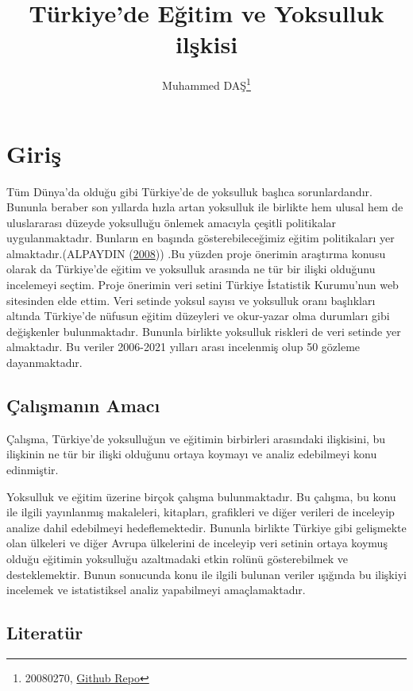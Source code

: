 \documentclass[
  12pt,
]{article}
\title{Türkiye'de Eğitim ve Yoksulluk ilşkisi}
\author{Muhammed DAŞ\footnote{20080270, \href{https://github.com/muhammedddas/aynen}{Github Repo}}}
\date{}
\begin{document}
\maketitle

\hypertarget{giriux15f}{%
\section{Giriş}\label{giriux15f}}

Tüm Dünya'da olduğu gibi Türkiye'de de yoksulluk başlıca sorunlardandır. Bununla beraber son yıllarda hızla artan yoksulluk ile birlikte hem ulusal hem de uluslararası düzeyde yoksulluğu önlemek amacıyla çeşitli politikalar uygulanmaktadır. Bunların en başında gösterebileceğimiz eğitim politikaları yer almaktadır.(ALPAYDIN (\protect\hyperlink{ref-alpaydin2008turkiye}{2008})) .Bu yüzden proje önerimin araştırma konusu olarak da Türkiye'de eğitim ve yoksulluk arasında ne tür bir ilişki olduğunu incelemeyi seçtim. Proje önerimin veri setini Türkiye İstatistik Kurumu'nun web sitesinden elde ettim. Veri setinde yoksul sayısı ve yoksulluk oranı başlıkları altında Türkiye'de nüfusun eğitim düzeyleri ve okur-yazar olma durumları gibi değişkenler bulunmaktadır. Bununla birlikte yoksulluk riskleri de veri setinde yer almaktadır. Bu veriler 2006-2021 yılları arası incelenmiş olup 50 gözleme dayanmaktadır.

\hypertarget{uxe7alux131ux15fmanux131n-amacux131}{%
\subsection{Çalışmanın Amacı}\label{uxe7alux131ux15fmanux131n-amacux131}}

Çalışma, Türkiye'de yoksulluğun ve eğitimin birbirleri arasındaki ilişkisini, bu ilişkinin ne tür bir ilişki olduğunu ortaya koymayı ve analiz edebilmeyi konu edinmiştir.

Yoksulluk ve eğitim üzerine birçok çalışma bulunmaktadır. Bu çalışma, bu konu ile ilgili yayınlanmış makaleleri, kitapları, grafikleri ve diğer verileri de inceleyip analize dahil edebilmeyi hedeflemektedir. Bununla birlikte Türkiye gibi gelişmekte olan ülkeleri ve diğer Avrupa ülkelerini de inceleyip veri setinin ortaya koymuş olduğu eğitimin yoksulluğu azaltmadaki etkin rolünü gösterebilmek ve desteklemektir. Bunun sonucunda konu ile ilgili bulunan veriler ışığında bu ilişkiyi incelemek ve istatistiksel analiz yapabilmeyi amaçlamaktadır.

\hypertarget{literatuxfcr}{%
\subsection{Literatür}\label{literatuxfcr}}
\end{document}
